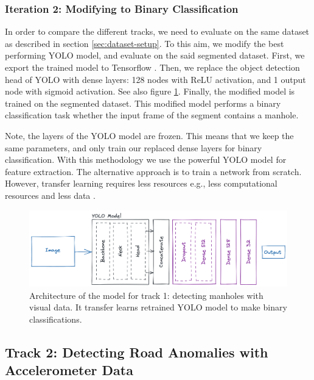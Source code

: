 \subsubsection{Iteration 2: Modifying to Binary Classification}
\label{sec:modifying-yolo}

In order to compare the different tracks, we need to evaluate on the same dataset as described in section \ref{sec:dataset-setup}. To this aim, we modify the best performing YOLO model, and evaluate on the said segmented dataset. First, we export the trained model to Tensorflow \cite{yolo-export}. Then, we replace the object detection head of YOLO with dense layers: 128 nodes with ReLU activation, and 1 output node with sigmoid activation. See also figure \ref{fig:modified-yolo}. Finally, the modified model is trained on the segmented dataset. This modified model performs a binary classification task whether the input frame of the segment contains a manhole. 

Note, the layers of the YOLO model are frozen. This means that we keep the same parameters, and only train our replaced dense layers for binary classification. With this methodology we use the powerful YOLO model for feature extraction. The alternative approach is to train a network from scratch. However, transfer learning requires less resources e.g., less computational resources and less data \cite{Goodfellow2016}.


\begin{figure}[ht]
\begin{center}
\includegraphics[width=.95\textwidth]{images/5_multimodal_fusion/modified-yolo-2.png}
\end{center}
\captionsetup{width=0.90\textwidth}
\caption{Architecture of the model for track 1: detecting manholes with visual data. It transfer learns retrained YOLO model to make binary classifications.}
\label{fig:modified-yolo}
\end{figure}



\subsection{Track 2: Detecting Road Anomalies with Accelerometer Data}
\label{sec:track-2-design}

